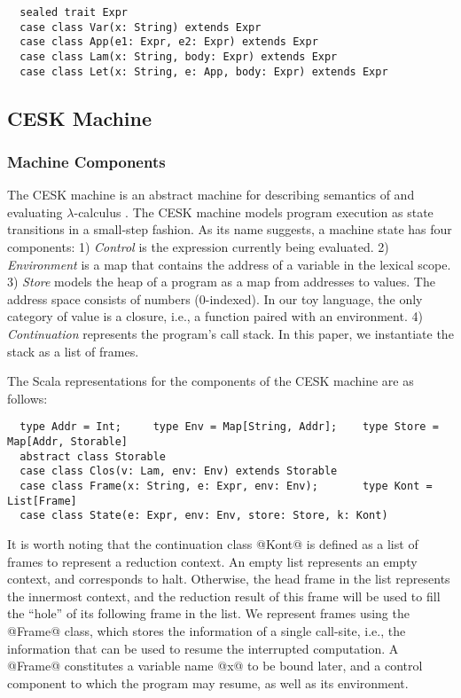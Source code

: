 \documentclass[acmsmall, review]{acmart}\settopmatter{}
\begin{document}
\begin{lstlisting}
  sealed trait Expr
  case class Var(x: String) extends Expr
  case class App(e1: Expr, e2: Expr) extends Expr
  case class Lam(x: String, body: Expr) extends Expr
  case class Let(x: String, e: App, body: Expr) extends Expr
\end{lstlisting}

\subsection{CESK Machine} \label{cesk}

\subsubsection{Machine Components}

The CESK machine is an abstract machine for describing semantics of and evaluating
$\lambda$-calculus \cite{felleisen1987calculus}. The CESK machine models program execution
as state transitions in a small-step fashion. As its name suggests, a machine state has
four components:
1) \textit{Control} is the expression currently being evaluated.
2) \textit{Environment} is a map that contains the address of a variable in the lexical scope.
3) \textit{Store} models the heap of a program as a map from addresses to values.
  The address space consists of numbers (0-indexed).
  In our toy language, the only category of value is a closure, i.e., a function paired with
  an environment.
4) \textit{Continuation} represents the program's call stack. In this paper, we instantiate the 
stack as a list of frames. 

The Scala representations for the components of the CESK machine are as follows:

\begin{lstlisting}
  type Addr = Int;     type Env = Map[String, Addr];    type Store = Map[Addr, Storable]
  abstract class Storable
  case class Clos(v: Lam, env: Env) extends Storable
  case class Frame(x: String, e: Expr, env: Env);       type Kont = List[Frame]
  case class State(e: Expr, env: Env, store: Store, k: Kont)
\end{lstlisting}

It is worth noting that the continuation class @Kont@ is defined as a list of
frames to represent a reduction context.
An empty list represents an empty context, and corresponds to halt. Otherwise, the head 
frame in the list represents the innermost context, and the reduction result of this 
frame will be used to fill the ``hole'' of its following frame in the list.
We represent frames using the @Frame@ class, which stores the information of a single
call-site, i.e., the information that can be used to resume the interrupted computation.
A @Frame@ constitutes a variable name @x@ to be bound later, and a control component
to which the program may resume, as well as its environment.
\end{document}
